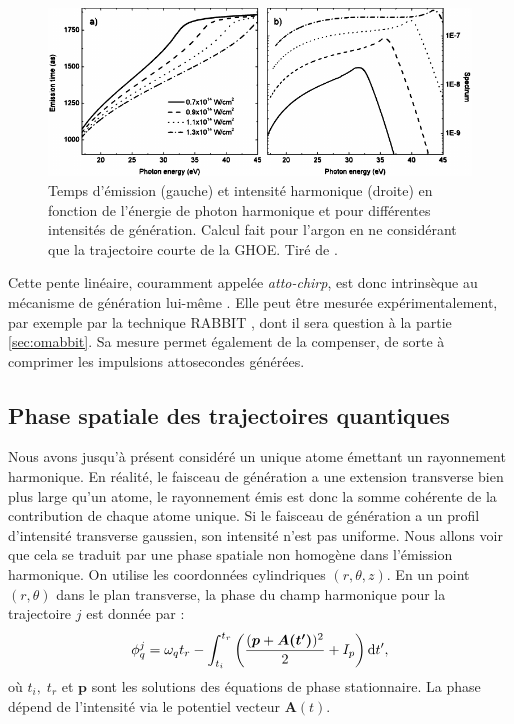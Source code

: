 \begin{figure}[!ht]
\centering
\includegraphics[width=0.8\columnwidth]{Figures/ThreeStep/gdd_argon.pdf}%
\caption{Temps d’émission (gauche) et intensité harmonique (droite) en fonction de l’énergie de photon harmonique et pour différentes intensités de génération. Calcul fait pour l’argon en ne considérant que la trajectoire courte de la GHOE. Tiré de .}
\label{fig:diveki}
\end{figure}

Cette pente linéaire, couramment appelée \textit{atto-chirp}, est donc intrinsèque au mécanisme de génération lui-même . Elle peut être mesurée expérimentalement, par exemple par la technique RABBIT , dont il sera question à la partie \ref{sec:omabbit}. Sa mesure permet également de la compenser, de sorte à comprimer les impulsions attosecondes générées.

\subsection{Phase spatiale des trajectoires quantiques}
\label{sec:phase_spatiale}
Nous avons jusqu'à présent considéré un unique atome émettant un rayonnement harmonique. En réalité, le faisceau de génération a une extension transverse bien plus large qu'un atome, le rayonnement émis est donc la somme cohérente de la contribution de chaque atome unique. Si le faisceau de génération a un profil d'intensité transverse gaussien, son intensité n'est pas uniforme. Nous allons voir que cela se traduit par une phase spatiale non homogène dans l'émission harmonique. On utilise les coordonnées cylindriques $(r,\theta,z)$. En un point $(r,\theta)$ dans le plan transverse, la phase du champ harmonique pour la trajectoire $j$ est donnée par :
\begin{equation}
\phi^j_q = \omega_q t_r - \int_{t_i}^{t_r}\left(\frac{({\bm{p}+\bm{A(t')}})^2}{2}+I_p\right)\mathrm{d} t',
\end{equation} 
où $t_i,\;t_r$ et $\bm{p}$ sont les solutions des équations de phase stationnaire. La phase dépend de l'intensité via le potentiel vecteur $\bm{A}(t)$. 

